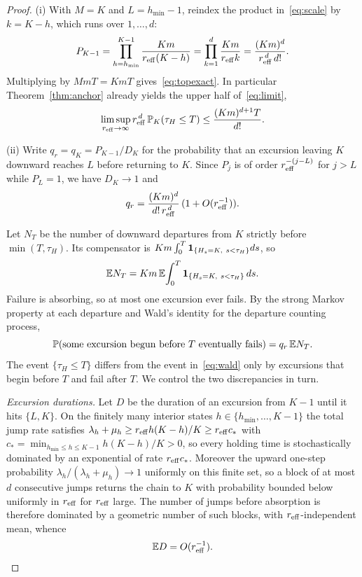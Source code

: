 \begin{proof}
(i) With $M=K$ and $L=h_{\min}-1$, reindex the product in~\eqref{eq:scale} by $k=K-h$, which runs over $1,\ldots,d$:
\[
 P_{K-1}=\prod_{h=h_{\min}}^{K-1}\frac{Km}{r_{\mathrm{eff}}(K-h)}
 =\prod_{k=1}^{d}\frac{Km}{r_{\mathrm{eff}} k}=\frac{(Km)^d}{r_{\mathrm{eff}}^{\,d}\,d!}.
\]
Multiplying by $MmT=KmT$ gives~\eqref{eq:topexact}. In particular Theorem~\ref{thm:anchor} already yields the upper half of~\eqref{eq:limit},
\[
 \limsup_{r_{\mathrm{eff}}\to\infty}r_{\mathrm{eff}}^{\,d}\,\mathbb P_K(\tau_H\le T)\le\frac{(Km)^{d+1}T}{d!}.
\]

(ii) Write $q_r=q_K=P_{K-1}/D_K$ for the probability that an excursion leaving $K$ downward reaches $L$ before returning to $K$. Since $P_j$ is of order $r_{\mathrm{eff}}^{-(j-L)}$ for $j>L$ while $P_L=1$, we have $D_K\to1$ and
\begin{equation}\label{eq:qasym}
 q_r=\frac{(Km)^d}{d!\,r_{\mathrm{eff}}^{\,d}}\,(1+O(r_{\mathrm{eff}}^{-1})).
\end{equation}

Let $N_T$ be the number of downward departures from $K$ strictly before $\min(T,\tau_H)$. Its compensator is $Km\int_0^T\1_{\{H_s=K,\ s<\tau_H\}}ds$, so
\begin{equation}\label{eq:EN}
 \mathbb E N_T=Km\,\mathbb E\!\int_0^T\mathbf 1_{\{H_s=K,\ s<\tau_H\}}\,ds.
\end{equation}
Failure is absorbing, so at most one excursion ever fails. By the strong Markov property at each departure and Wald's identity for the departure counting process,
\begin{equation}\label{eq:wald}
 \mathbb P(\hbox{some excursion begun before }T\hbox{ eventually fails})=q_r\,\mathbb E N_T .
\end{equation}
The event $\{\tau_H\le T\}$ differs from the event in~\eqref{eq:wald} only by excursions that begin before $T$ and fail after $T$. We control the two discrepancies in turn.

\emph{Excursion durations.} Let $D$ be the duration of an excursion from $K-1$ until it hits $\{L,K\}$. On the finitely many interior states $h\in\{h_{\min},\ldots,K-1\}$ the total jump rate satisfies
$\lambda_h+\mu_h\ge r_{\mathrm{eff}} h(K-h)/K\ge r_{\mathrm{eff}} c_*$ with
$c_*=\min_{h_{\min}\le h\le K-1}h(K-h)/K>0$, so every holding time is stochastically dominated by an exponential of rate $r_{\mathrm{eff}} c_*$. Moreover the upward one-step probability $\lambda_h/(\lambda_h+\mu_h)\to1$ uniformly on this finite set, so a block of at most $d$ consecutive jumps returns the chain to $K$ with probability bounded below uniformly in $r_{\mathrm{eff}}$ for $r_{\mathrm{eff}}$ large. The number of jumps before absorption is therefore dominated by a geometric number of such blocks, with $r_{\mathrm{eff}}$-independent mean, whence
\begin{equation}\label{eq:ED}
 \mathbb E D=O(r_{\mathrm{eff}}^{-1}).
\end{equation}


\end{proof}
